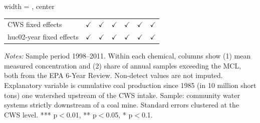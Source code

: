 \begin{table}[htbp]
\begin{adjustbox}{width = \textwidth, center}
\begin{tabular}{lcccccc}
          \\
         
         CWS fixed effects                   & $\checkmark$   & $\checkmark$          & $\checkmark$  & $\checkmark$   & $\checkmark$   & $\checkmark$\\   
         huc02-year fixed effects            & $\checkmark$   & $\checkmark$          & $\checkmark$  & $\checkmark$   & $\checkmark$   & $\checkmark$\\   
         
         \bottomrule
         
      \end{tabular}
      
      
      
   \end{adjustbox}
      {\tiny\linespread{1}\selectfont \par \raggedright 
   \textit{Notes:} Sample period 1998--2011. Within each chemical, columns show (1) mean measured concentration and (2) share of annual samples exceeding the MCL, both from the EPA 6-Year Review. Non-detect values are not imputed. Explanatory variable is cumulative coal production since 1985 (in 10 million short tons) one watershed upstream of the CWS intake. Sample: community water systems strictly downstream of a coal mine. Standard errors clustered at the CWS level. *** p$<$0.01, ** p$<$0.05, * p$<$0.1.}
   
\end{table}


